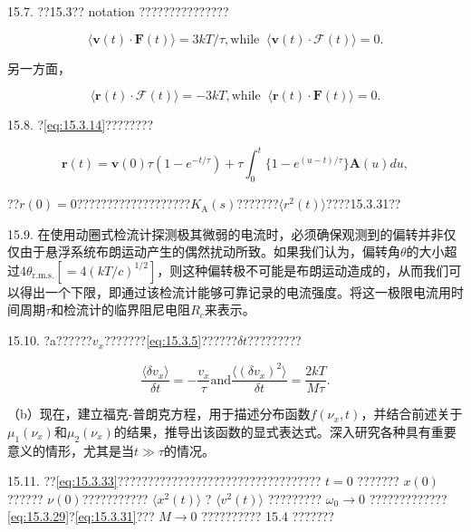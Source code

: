 15.7. ??15.3?? notation ???????????????

\begin{equation}\tag{15.6.69}\label{eq:15.6.69}
\langle \pmb { v } ( t ) \cdot \pmb { F } ( t ) \rangle = 3 k T / \tau ,  \mathrm { w h i l e } \; \; \langle \pmb { v } ( t ) \cdot \pmb { \mathcal { F } } ( t ) \rangle = 0 .
\end{equation}

另一方面，

\begin{equation}\tag{15.6.70}\label{eq:15.6.70}
\langle \pmb { r } ( t ) \cdot \mathcal { F } ( t ) \rangle = - 3 k T ,  \mathrm { w h i l e } \; \; \langle \pmb { r } ( t ) \cdot \pmb { F } ( t ) \rangle = 0 .
\end{equation}

15.8. ?\autoref{eq:15.3.14}????????

\begin{equation}\tag{15.6.71}\label{eq:15.6.71}
\pmb { r } ( t ) = \pmb { v } ( 0 ) \tau ( 1 - e ^{- t / \tau} ) + \tau \int _ { 0 } ^{t} \{ 1 - e ^{( u - t ) / \tau} \} \pmb { A } ( u ) d u ,
\end{equation}

??\(r(0)=0\)???????????????????\(K_{\mathrm{A}}(s)\)???????\(\langle r^{2}(t)\rangle\)????15.3.31??

15.9. 在使用动圈式检流计探测极其微弱的电流时，必须确保观测到的偏转并非仅仅由于悬浮系统布朗运动产生的偶然扰动所致。如果我们认为，偏转角\(\theta\)的大小超过\(4\theta_{\mathrm{r.m.s.}}[=4(kT/c)^{1/2}]\)，则这种偏转极不可能是布朗运动造成的，从而我们可以得出一个下限，即通过该检流计能够可靠记录的电流强度。将这一极限电流用时间周期\(\tau\)和检流计的临界阻尼电阻\(R_{c}\)来表示。

15.10. ?a??????\(v_{x}\)???????\autoref{eq:15.3.5}??????\(\delta t\)?????????

\begin{equation}\tag{15.6.72}\label{eq:15.6.72}
\frac { \langle \delta v _ { x } \rangle } { \delta t } = - \frac { v _ { x } } { \tau }  \mathrm { a n d }  \frac { \langle ( \delta v _ { x } ) ^{2} \rangle } { \delta t } = \frac { 2 k T } { M \tau } .
\end{equation}

（b）现在，建立福克-普朗克方程，用于描述分布函数\(f(\nu_x,t)\)，并结合前述关于\(\mu_1(\nu_x)\)和\(\mu_2(\nu_x)\)的结果，推导出该函数的显式表达式。深入研究各种具有重要意义的情形，尤其是当\(t \gg \tau\)的情况。

15.11. ??\autoref{eq:15.3.33}?????????????????????????????????? \(t=0\) ??????? \(x(0)\)?????? \(\nu(0)\)??????????? \(\langle x^2(t) \rangle\) ? \(\langle v^2(t) \rangle\) ????????? \(\omega_0 \to 0\) ?????????????\autoref{eq:15.3.29}?\autoref{eq:15.3.31}??? \(M \to 0\) ?????????? 15.4 ???????

